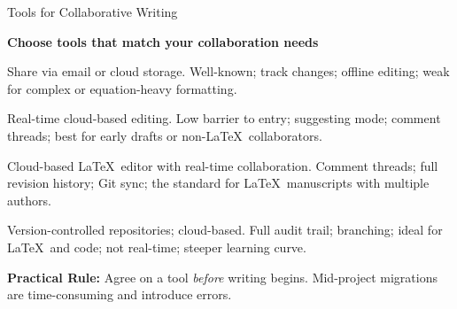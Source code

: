 \documentclass{beamer}
\begin{document}
\begin{frame}{Tools for Collaborative Writing}

  \footnotesize
  \textbf{Choose tools that match your collaboration needs}

  \begin{description}
    \setlength{\itemsep}{5pt}
    \item[\textbf{MS Word / Apple Pages}]
      Share via email or cloud storage.
      Well-known; track changes; offline editing;
      weak for complex or equation-heavy formatting.

    \item[\textbf{Google Docs}]
      Real-time cloud-based editing.
      Low barrier to entry; suggesting mode; comment threads;
      best for early drafts or non-\LaTeX\ collaborators.

    \item[\textbf{Overleaf}]
      Cloud-based \LaTeX\ editor with real-time collaboration.
      Comment threads; full revision history; Git sync;
      the standard for \LaTeX\ manuscripts with multiple authors.

    \item[\textbf{Git / GitHub}]
      Version-controlled repositories; cloud-based.
      Full audit trail; branching; ideal for \LaTeX\ and code;
      not real-time; steeper learning curve.

  \end{description}

  \medskip
  \textbf{Practical Rule:} Agree on a tool \emph{before} writing begins. Mid-project migrations are
  time-consuming and introduce errors.

\end{frame}
\end{document}
